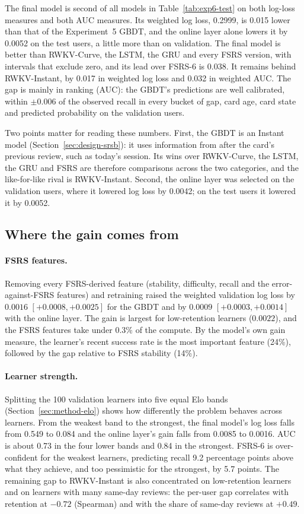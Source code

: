 The final model is second of all models in Table~\ref{tab:exp6-test} on both log-loss measures and both AUC measures. Its
weighted log loss, 0.2999, is 0.015 lower than that of the Experiment~5 GBDT, and the online layer alone lowers it by 0.0052
on the test users, a little more than on validation. The final model is better than RWKV-Curve, the LSTM, the GRU and every
FSRS version, with intervals that exclude zero, and its lead over FSRS-6 is 0.038. It remains behind RWKV-Instant, by 0.017 in
weighted log loss and 0.032 in weighted AUC. The gap is mainly in ranking (AUC): the GBDT's predictions are well calibrated, within $\pm 0.006$ of the
observed recall in every bucket of gap, card age, card state and predicted probability on the validation users.

Two points matter for reading these numbers. First, the GBDT is an Instant model (Section~\ref{sec:design-srsb}): it uses
information from after the card's previous review, such as today's session. Its wins over RWKV-Curve, the LSTM, the GRU and
FSRS are therefore comparisons across the two categories, and the like-for-like rival is RWKV-Instant. Second, the online
layer was selected on the validation users, where it lowered log loss by 0.0042; on the test users it lowered it by 0.0052.

\subsection{Where the gain comes from}
\label{sec:results-exp6-where}

\paragraph{FSRS features.} Removing every FSRS-derived feature (stability, difficulty, recall and the error-against-FSRS
features) and retraining raised the weighted validation log loss by $0.0016$ $[+0.0008, +0.0025]$ for the GBDT and by
$0.0009$ $[+0.0003, +0.0014]$ with the online layer. The gain is largest for low-retention learners ($0.0022$), and the FSRS
features take under 0.3\% of the compute. By the model's own gain measure, the learner's recent success rate is the most
important feature (24\%), followed by the gap relative to FSRS stability (14\%).

\paragraph{Learner strength.} Splitting the 100 validation learners into five equal Elo bands
(Section~\ref{sec:method-elo}) shows how differently the problem behaves across learners. From the weakest band to the
strongest, the final model's log loss falls from 0.549 to 0.084 and the online layer's gain falls from 0.0085 to 0.0016.
AUC is about 0.73 in the four lower bands and 0.84 in the strongest. FSRS-6 is over-confident for the weakest learners,
predicting recall 9.2 percentage points above what they achieve, and too pessimistic for the strongest, by 5.7 points. The
remaining gap to RWKV-Instant is also concentrated on low-retention learners and on learners with many same-day reviews: the
per-user gap correlates with retention at $-0.72$ (Spearman) and with the share of same-day reviews at $+0.49$.

